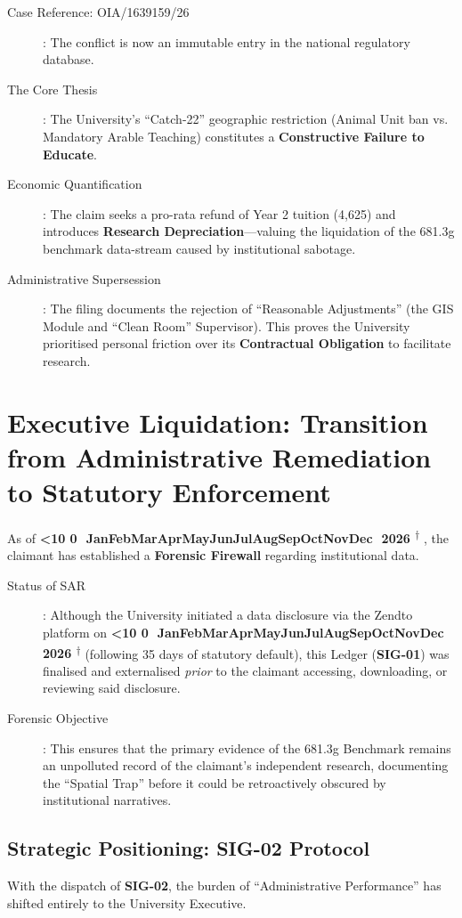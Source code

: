 \documentclass{EMBASSY}
\DeclareRobustCommand{\gmt}[3]{%
    \texorpdfstring{%
        {\color{DateGold}\textbf{%
            \ifnum#1<10 0\fi#1\,\textperiodcentered\,%
            \ifcase#2\or Jan\or Feb\or Mar\or Apr\or May\or Jun\or Jul\or Aug\or Sep\or Oct\or Nov\or Dec\fi
            \,\textperiodcentered\,20#3%
            \textsuperscript{$\dagger$}%
        }}%
    }{%
        (#1/#2/#3)%
    }%
}
\begin{document}
\begin{description}
	\item[Case Reference: OIA/1639159/26]: The conflict is now an immutable entry in the national regulatory database.
	\item[The Core Thesis]: The University's ``Catch-22'' geographic restriction (Animal Unit ban vs. Mandatory Arable Teaching) constitutes a \textbf{Constructive Failure to Educate}.
	\item[Economic Quantification]: The claim seeks a pro-rata refund of Year 2 tuition (4,625) and introduces \textbf{Research Depreciation}—valuing the liquidation of the 681.3g benchmark data-stream caused by institutional sabotage.
	\item[Administrative Supersession]: The filing documents the rejection of ``Reasonable Adjustments'' (the GIS Module and ``Clean Room'' Supervisor). This proves the University prioritised personal friction over its \textbf{Contractual Obligation} to facilitate research.
\end{description}

\section{Executive Liquidation: Transition from Administrative Remediation to Statutory Enforcement}
As of \gmt{23}{01}{26}, the claimant has established a \textbf{Forensic Firewall} regarding institutional data.

\begin{description}
	\item[Status of SAR]: Although the University initiated a data disclosure via the Zendto platform on \gmt{22}{01}{26} (following 35 days of statutory default), this Ledger (\textbf{SIG-01}) was finalised and externalised \textit{prior} to the claimant accessing, downloading, or reviewing said disclosure.
	\item[Forensic Objective]: This ensures that the primary evidence of the 681.3g Benchmark remains an unpolluted record of the claimant's independent research, documenting the ``Spatial Trap'' before it could be retroactively obscured by institutional narratives.
\end{description}

\subsection{Strategic Positioning: SIG-02 Protocol}
With the dispatch of \textbf{SIG-02}, the burden of ``Administrative Performance'' has shifted entirely to the University Executive.
\end{document}
